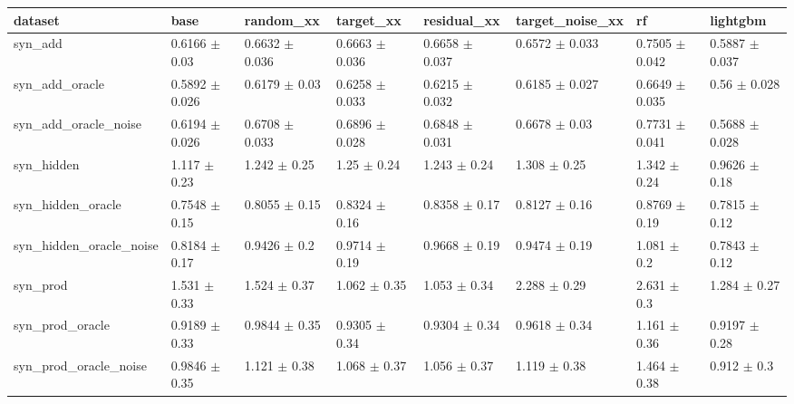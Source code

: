 \begin{tabular}{llllllll}
\toprule
dataset & base & random\_xx & target\_xx & residual\_xx & target\_noise\_xx & rf & lightgbm \\
\midrule
syn\_add & 0.6166 $\pm$ 0.03 & 0.6632 $\pm$ 0.036 & 0.6663 $\pm$ 0.036 & 0.6658 $\pm$ 0.037 & 0.6572 $\pm$ 0.033 & 0.7505 $\pm$ 0.042 & 0.5887 $\pm$ 0.037 \\
syn\_add\_oracle & 0.5892 $\pm$ 0.026 & 0.6179 $\pm$ 0.03 & 0.6258 $\pm$ 0.033 & 0.6215 $\pm$ 0.032 & 0.6185 $\pm$ 0.027 & 0.6649 $\pm$ 0.035 & 0.56 $\pm$ 0.028 \\
syn\_add\_oracle\_noise & 0.6194 $\pm$ 0.026 & 0.6708 $\pm$ 0.033 & 0.6896 $\pm$ 0.028 & 0.6848 $\pm$ 0.031 & 0.6678 $\pm$ 0.03 & 0.7731 $\pm$ 0.041 & 0.5688 $\pm$ 0.028 \\
syn\_hidden & 1.117 $\pm$ 0.23 & 1.242 $\pm$ 0.25 & 1.25 $\pm$ 0.24 & 1.243 $\pm$ 0.24 & 1.308 $\pm$ 0.25 & 1.342 $\pm$ 0.24 & 0.9626 $\pm$ 0.18 \\
syn\_hidden\_oracle & 0.7548 $\pm$ 0.15 & 0.8055 $\pm$ 0.15 & 0.8324 $\pm$ 0.16 & 0.8358 $\pm$ 0.17 & 0.8127 $\pm$ 0.16 & 0.8769 $\pm$ 0.19 & 0.7815 $\pm$ 0.12 \\
syn\_hidden\_oracle\_noise & 0.8184 $\pm$ 0.17 & 0.9426 $\pm$ 0.2 & 0.9714 $\pm$ 0.19 & 0.9668 $\pm$ 0.19 & 0.9474 $\pm$ 0.19 & 1.081 $\pm$ 0.2 & 0.7843 $\pm$ 0.12 \\
syn\_prod & 1.531 $\pm$ 0.33 & 1.524 $\pm$ 0.37 & 1.062 $\pm$ 0.35 & 1.053 $\pm$ 0.34 & 2.288 $\pm$ 0.29 & 2.631 $\pm$ 0.3 & 1.284 $\pm$ 0.27 \\
syn\_prod\_oracle & 0.9189 $\pm$ 0.33 & 0.9844 $\pm$ 0.35 & 0.9305 $\pm$ 0.34 & 0.9304 $\pm$ 0.34 & 0.9618 $\pm$ 0.34 & 1.161 $\pm$ 0.36 & 0.9197 $\pm$ 0.28 \\
syn\_prod\_oracle\_noise & 0.9846 $\pm$ 0.35 & 1.121 $\pm$ 0.38 & 1.068 $\pm$ 0.37 & 1.056 $\pm$ 0.37 & 1.119 $\pm$ 0.38 & 1.464 $\pm$ 0.38 & 0.912 $\pm$ 0.3 \\
\bottomrule
\end{tabular}
